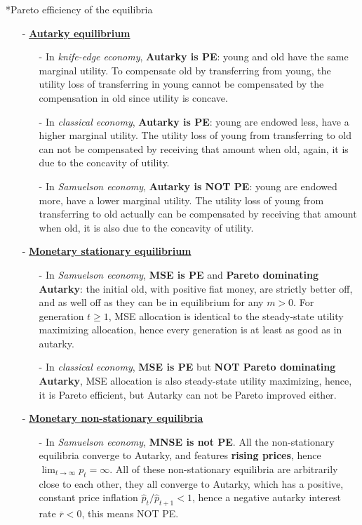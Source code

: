 \documentclass[10pt,landscape,a4paper]{article}
\makeatletter
\let\bar\overline
\renewcommand{\subsection}{\@startsection{subsection}{1}{0mm}{.2ex}{.2ex}{\small\bfseries}}
\makeatother
\begin{document}
\begin{multicols*}{3}
\subsection*{Pareto efficiency of the equilibria}
\begin{itemize}
    \item[-] \underline{\textbf{Autarky equilibrium}} 
    \begin{itemize}
        \item[-] In \textit{knife-edge economy}, \textbf{Autarky is PE}: young and old have the same marginal utility. To compensate old by transferring from young, the utility loss of transferring in young cannot be compensated by the compensation in old since utility is concave.
        \item[-] In \textit{classical economy}, \textbf{Autarky is PE}: young are endowed less, have a higher marginal utility. The utility loss of young from transferring to old can not be compensated by receiving that amount when old, again, it is due to the concavity of utility.
        \item[-] In \textit{Samuelson economy}, \textbf{Autarky is NOT PE}: young are endowed more, have a lower marginal utility. The utility loss of young from transferring to old actually can be compensated by receiving that amount when old, it is also due to the concavity of utility.
    \end{itemize}
    
    \item[-] \underline{\textbf{Monetary stationary equilibrium}}
    \begin{itemize}
        \item[-] In \textit{Samuelson economy}, \textbf{MSE is PE} and \textbf{Pareto dominating Autarky}: the initial old, with positive fiat money, are strictly better off, and as well off as they can be in equilibrium for any $m>0$. For generation $t\geq 1$, MSE allocation is identical to the steady-state utility maximizing allocation, hence every generation is at least as good as in autarky.
        
        \item[-] In \textit{classical economy}, \textbf{MSE is PE} but \textbf{NOT Pareto dominating Autarky}, MSE allocation is also steady-state utility maximizing, hence, it is Pareto efficient, but Autarky can not be Pareto improved either.
    \end{itemize}
    \item[-] \underline{\textbf{Monetary non-stationary equilibria}}
    \begin{itemize}
        \item[-] In \textit{Samuelson economy}, \textbf{MNSE is not PE}. All the non-stationary equilibria converge to Autarky, and features \textbf{rising prices}, hence $\lim_{t\rightarrow\infty}p_t=\infty$. All of these non-stationary equilibria are arbitrarily close to each other, they all converge to Autarky, which has a positive, constant price inflation $\hat{p}_t/\hat{p}_{t+1}<1$, hence a negative autarky interest rate $\bar{r}<0$, this means NOT PE.
        

\end{itemize}
\end{itemize}
\end{multicols*}
\end{document}
